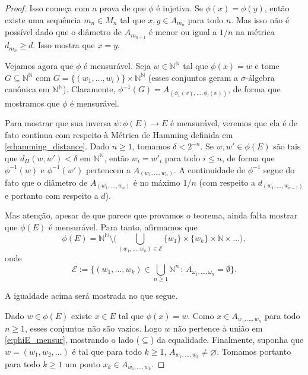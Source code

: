 \begin{proof}
  Isso começa com a prova de que $\phi$ é injetiva.
  Se $\phi(x) = \phi(y)$, então existe uma sequência $m_n \in M_n$ tal que $x, y \in A_{m_n}$ para todo $n$.
  Mas isso não é possível dado que o diâmetro de $A_{m_{n+1}}$ é menor ou igual a $1/n$ na métrica $d_{m_n} \geq d$.
  Isso mostra que $x = y$.

  Vejamos agora que $\phi$ é mensurável.
  Seja $w \in \mathbb{N}^\mathbb{N}$ tal que $\phi(x) = w$ e tome $G \subseteq \mathbb{N}^\mathbb{N}$ com $G = \{(w_1, \dots, w_l)\} \times \mathbb{N}^\mathbb{N}$ (esses conjuntos geram a $\sigma$-álgebra canônica em $\mathbb{N}^\mathbb{N}$).
  Claramente, $\phi^{-1}(G) = A_{(\phi_1(x), \dots, \phi_l(x))}$, de forma que mostramos que $\phi$ é mensurável.

  Para mostrar que sua inversa $\psi:\phi(E) \to E$ é mensurável, veremos que ela é de fato contínua com respeito à Métrica de Hamming definida em \eqref{e:hamming_distance}.
  Dado $n \geq 1$, tomamos $\delta < 2^{-n}$.
  Se $w, w' \in \phi(E)$ são tais que $d_H(w, w') < \delta$ em $\mathbb{N}^\mathbb{N}$, então $w_i = w'_i$ para todo $i \leq n$, de forma que $\phi^{-1}(w)$ e $\phi^{-1}(w')$ pertencem a $A_{(w_1, \dots, w_n)}$.
  A continuidade de $\phi^{-1}$ segue do fato que o diâmetro de $A_{(w_1, \dots, w_n)}$ é no máximo $1/n$ (com respeito a $d_{(w_1, \dots, w_{n-1})}$ e portanto com respeito a $d$).

  Mas atenção, apesar de que parece que provamos o teorema, ainda falta mostrar que $\phi(E)$ é mensurável.
  Para tanto, afirmamos que
  \begin{equation}
    \label{e:phiE_mensur}
    \phi(E) = \mathbb{N}^\mathbb{N} \setminus \Big( \bigcup_{(w_1, \dots, w_k)\in \mathcal{E}} \{w_1\} \times \{w_k\} \times \mathbb{N} \times \dots \Big),
  \end{equation}
  onde
  \begin{equation*}
   \mathcal{E}:=\{ (w_1, \dots, w_k)\in \bigcup_{n\ge 1} \mathbb{N}^n \, : \, A_{\omega_1,\dots,\omega_n}=\emptyset \}.
  \end{equation*}

  A igualdade acima será mostrada no que segue.

  Dado $w \in \phi(E)$ existe $x \in E$ tal que $\phi(x) = w$.
  Como $x \in A_{w_1, \dots, w_n}$ para todo $n \geq 1$, esses conjuntos não são vazios.
  Logo $w$ não pertence à união em \eqref{e:phiE_mensur}, mostrando o lado ($\subseteq$) da equalidade.
  Finalmente, suponha que $w = (w_1, w_2, \dots)$ é tal que para todo $k \geq 1$, $A_{w_1, \dots, w_k} \neq \varnothing$.
  Tomamos portanto para todo $k \geq 1$ um ponto $x_k \in A_{w_1, \dots, w_k}$.


\end{proof}
